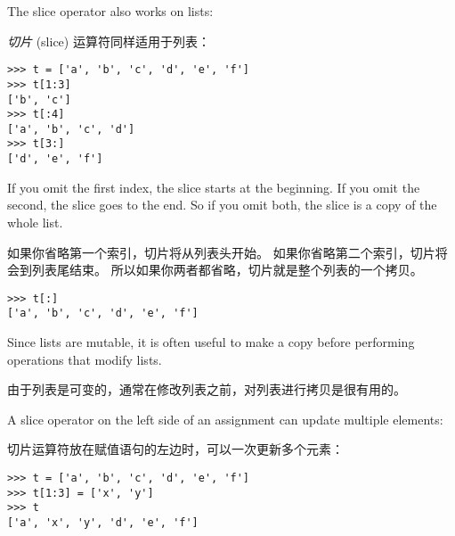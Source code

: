 The slice operator also works on lists:

{\em 切片} (slice) 运算符同样适用于列表：


\begin{lstlisting}
>>> t = ['a', 'b', 'c', 'd', 'e', 'f']
>>> t[1:3]
['b', 'c']
>>> t[:4]
['a', 'b', 'c', 'd']
>>> t[3:]
['d', 'e', 'f']
\end{lstlisting}
%
If you omit the first index, the slice starts at the beginning.
If you omit the second, the slice goes to the end.  So if you
omit both, the slice is a copy of the whole list.

如果你省略第一个索引，切片将从列表头开始。 如果你省略第二个索引，切片将会到列表尾结束。
所以如果你两者都省略，切片就是整个列表的一个拷贝。
  

\begin{lstlisting}
>>> t[:]
['a', 'b', 'c', 'd', 'e', 'f']
\end{lstlisting}

%
Since lists are mutable, it is often useful to make a copy
before performing operations that modify lists.

由于列表是可变的，通常在修改列表之前，对列表进行拷贝是很有用的。

A slice operator on the left side of an assignment
can update multiple elements:

切片运算符放在赋值语句的左边时，可以一次更新多个元素：
  

\begin{lstlisting}
>>> t = ['a', 'b', 'c', 'd', 'e', 'f']
>>> t[1:3] = ['x', 'y']
>>> t
['a', 'x', 'y', 'd', 'e', 'f']
\end{lstlisting}

%


%

%


